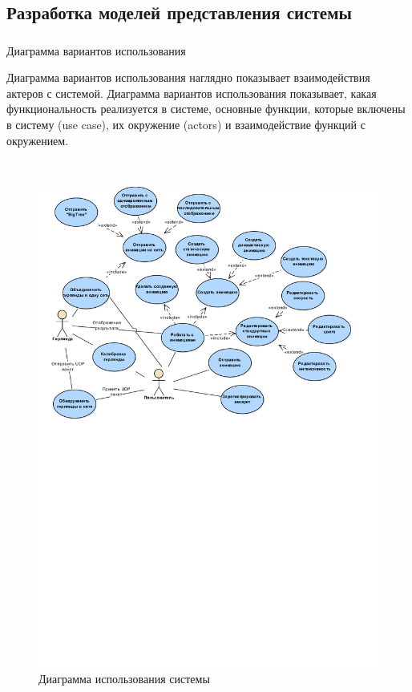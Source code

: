 \newpage
\subsection{Разработка моделей представления системы}
\label{sec:develop:umlDiagrams}

\subsubsection{} Диаграмма вариантов использования
\label{sec:develop:umlDiagrams:useCase}

Диаграмма вариантов использования наглядно показывает взаимодействия актеров с системой. Диаграмма вариантов использования показывает, какая функциональность реализуется в системе, основные функции, которые включены в систему (use case), их окружение (actors) и взаимодействие функций с окружением.

~
\begin{figure}[H]
\centering
	\includegraphics[scale=0.9]{figures/uml_useCase.pdf}
	\caption{Диаграмма использования системы}
	\label{fig:develop:umlDiagrams:useCase}
\end{figure}

